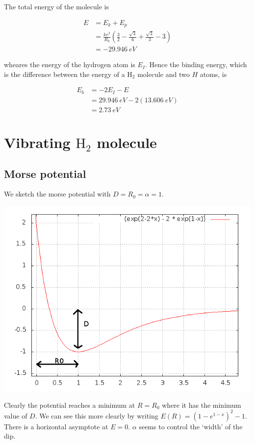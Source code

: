 \documentclass{article}
\begin{document}
The total energy of the molecule is

\begin{align*}
E &= E_k + E_p \\
&= \frac{ke^2}{R_0} \left(\frac{3}{2} - \frac{\sqrt 3}{6} + \frac{\sqrt 3}{3} - 3\right) \\
&= -29.946\ eV
\end{align*}

wheares the energy of the hydrogen atom is $E_I$. Hence the binding energy, which is the difference between the energy of a $\mathrm{H_2}$ molecule and two $H$ atoms, is

\begin{align*}
E_b &= -2 E_I - E \\
&= 29.946\ eV - 2(13.606\ eV) \\
&= 2.73\ eV
\end{align*}

\section{Vibrating $\mathrm{H_2}$ molecule}

\subsection{Morse potential}

We sketch the morse potential with $D=R_0=\alpha=1$.

\includegraphics[width=\textwidth]{morse.png}

Clearly the potential reaches a minimum at $R = R_0$ where it has the minimum value of $D$. We can see this more clearly by writing $E(R) = (1 - e^{1-x})^2 - 1$. There is a horizontal asymptote at $E = 0$. $\alpha$ seems to control the `width' of the dip.
\end{document}

